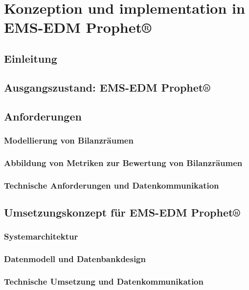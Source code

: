 \documentclass[a4paper,10pt,twoside]{report}
\begin{document}

\chapter{Konzeption und implementation in EMS-EDM Prophet®}
\section{Einleitung}

\section{Ausgangszustand: EMS-EDM Prophet®}

\section{Anforderungen}
\subsection{Modellierung von Bilanzräumen}

\subsection{Abbildung von Metriken zur Bewertung von Bilanzräumen}

\subsection{Technische Anforderungen und Datenkommunikation}


\section{Umsetzungskonzept für EMS-EDM Prophet®}

\subsection{Systemarchitektur}
\subsection{Datenmodell und Datenbankdesign}
\subsection{Technische Umsetzung und Datenkommunikation}
\end{document}
